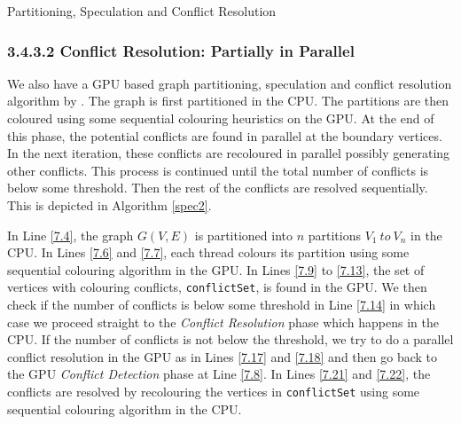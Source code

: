 \documentclass[MTech]{iitmdiss}
\makeatletter
\def\BState{\State\hskip-\ALG@thistlm}
\makeatother
\begin{document}
\begin{algorithm}
\caption{Partitioning, Speculation and Conflict Resolution}\label{spec1}
\end{algorithm}

\subsubsection{3.4.3.2 \: \: Conflict Resolution: Partially in Parallel}
We also have a GPU based graph partitioning, speculation and conflict resolution algorithm by \citet{Grosset:2011:EGC:2038037.1941597}. The graph is first partitioned in the CPU. The partitions are then coloured using some sequential colouring heuristics on the GPU. At the end of this phase, the potential conflicts are found in parallel at the boundary vertices. In the next iteration, these conflicts are recoloured in parallel possibly generating other conflicts. This process is continued until the total number of conflicts is below some threshold. Then the rest of the conflicts are resolved sequentially. This is depicted in Algorithm \ref{spec2}.

In Line \ref{7.4}, the graph $G(V,E)$ is partitioned into $n$ partitions $V_{1} \: to \: V_{n}$ in the CPU. In Lines \ref{7.6} and \ref{7.7}, each thread colours its partition using some sequential colouring algorithm in the GPU. In Lines \ref{7.9} to \ref{7.13}, the set of vertices with colouring conflicts, \verb+conflictSet+, is found in the GPU. We then check if the number of conflicts is below some threshold in Line \ref{7.14} in which case we proceed straight to the \textit{Conflict Resolution} phase which happens in the CPU. If the number of conflicts is not below the threshold, we try to do a parallel conflict resolution in the GPU as in Lines \ref{7.17} and \ref{7.18} and then go back to the GPU \textit{Conflict Detection} phase at Line \ref{7.8}. In Lines \ref{7.21} and \ref{7.22}, the conflicts are resolved by recolouring the vertices in \verb+conflictSet+ using some sequential colouring algorithm in the CPU.
\end{document}
